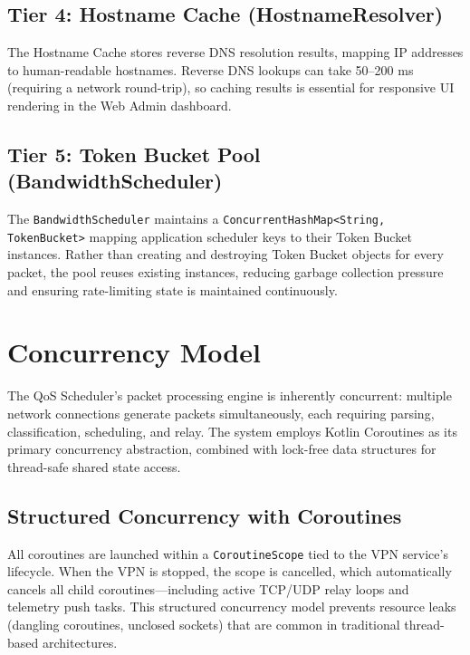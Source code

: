 \subsection{Tier 4: Hostname Cache (HostnameResolver)}

The Hostname Cache stores reverse DNS resolution results, mapping IP addresses to human-readable hostnames. Reverse DNS lookups can take 50--200 ms (requiring a network round-trip), so caching results is essential for responsive UI rendering in the Web Admin dashboard.

\subsection{Tier 5: Token Bucket Pool (BandwidthScheduler)}

The \texttt{BandwidthScheduler} maintains a \texttt{ConcurrentHashMap<String, TokenBucket>} mapping application scheduler keys to their Token Bucket instances. Rather than creating and destroying Token Bucket objects for every packet, the pool reuses existing instances, reducing garbage collection pressure and ensuring rate-limiting state is maintained continuously.

\section{Concurrency Model}
\label{sec:concurrency}

The QoS Scheduler's packet processing engine is inherently concurrent: multiple network connections generate packets simultaneously, each requiring parsing, classification, scheduling, and relay. The system employs Kotlin Coroutines as its primary concurrency abstraction, combined with lock-free data structures for thread-safe shared state access.

\subsection{Structured Concurrency with Coroutines}

All coroutines are launched within a \texttt{CoroutineScope} tied to the VPN service's lifecycle. When the VPN is stopped, the scope is cancelled, which automatically cancels all child coroutines---including active TCP/UDP relay loops and telemetry push tasks. This structured concurrency model prevents resource leaks (dangling coroutines, unclosed sockets) that are common in traditional thread-based architectures.

